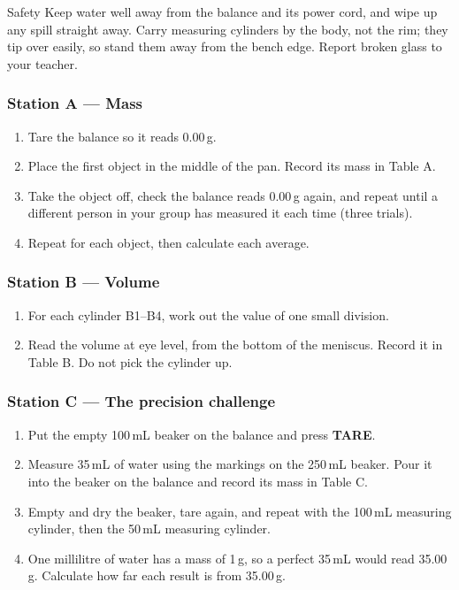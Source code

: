 \begin{infobox}{Safety}
Keep water well away from the balance and its power cord, and wipe up any spill straight away. Carry measuring cylinders by the body, not the rim; they tip over easily, so stand them away from the bench edge. Report broken glass to your teacher.
\end{infobox}

\subsubsection*{Station A --- Mass \hfill {}}
\begin{enumerate}[itemsep=2pt]
  \item Tare the balance so it reads 0.00\,g.
  \item Place the first object in the middle of the pan. Record its mass in Table A.
  \item Take the object off, check the balance reads 0.00\,g again, and repeat until a different person in your group has measured it each time (three trials).
  \item Repeat for each object, then calculate each average.
\end{enumerate}

\subsubsection*{Station B --- Volume}
\begin{enumerate}[itemsep=2pt]
  \item For each cylinder B1--B4, work out the value of one small division.
  \item Read the volume at eye level, from the bottom of the meniscus. Record it in Table B. Do not pick the cylinder up.
\end{enumerate}

\subsubsection*{Station C --- The precision challenge}
\begin{enumerate}[itemsep=2pt]
  \item Put the empty 100\,mL beaker on the balance and press \textbf{TARE}.
  \item Measure 35\,mL of water using the markings on the 250\,mL beaker. Pour it into the beaker on the balance and record its mass in Table C.
  \item Empty and dry the beaker, tare again, and repeat with the 100\,mL measuring cylinder, then the 50\,mL measuring cylinder.
  \item One millilitre of water has a mass of 1\,g, so a perfect 35\,mL would read 35.00\,g. Calculate how far each result is from 35.00\,g.
\end{enumerate}

